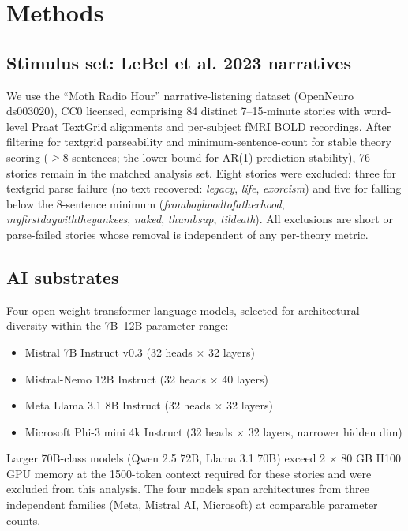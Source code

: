 \documentclass[11pt,a4paper]{article}
\begin{document}
\section{Methods}

\subsection{Stimulus set: LeBel et al. 2023 narratives}

We use the \citet{lebel2023natural} ``Moth Radio Hour'' narrative-listening dataset (OpenNeuro ds003020), CC0 licensed, comprising 84 distinct 7--15-minute stories with word-level Praat TextGrid alignments and per-subject fMRI BOLD recordings. After filtering for textgrid parseability and minimum-sentence-count for stable theory scoring ($\geq 8$ sentences; the lower bound for AR(1) prediction stability), 76 stories remain in the matched analysis set. Eight stories were excluded: three for textgrid parse failure (no text recovered: \emph{legacy}, \emph{life}, \emph{exorcism}) and five for falling below the 8-sentence minimum (\emph{fromboyhoodtofatherhood}, \emph{myfirstdaywiththeyankees}, \emph{naked}, \emph{thumbsup}, \emph{tildeath}). All exclusions are short or parse-failed stories whose removal is independent of any per-theory metric.

\subsection{AI substrates}

Four open-weight transformer language models, selected for architectural diversity within the 7B--12B parameter range:

\begin{itemize}
  \item Mistral 7B Instruct v0.3 (32 heads $\times$ 32 layers)
  \item Mistral-Nemo 12B Instruct (32 heads $\times$ 40 layers)
  \item Meta Llama 3.1 8B Instruct (32 heads $\times$ 32 layers)
  \item Microsoft Phi-3 mini 4k Instruct (32 heads $\times$ 32 layers, narrower hidden dim)
\end{itemize}

Larger 70B-class models (Qwen 2.5 72B, Llama 3.1 70B) exceed 2 $\times$ 80 GB H100 GPU memory at the 1500-token context required for these stories and were excluded from this analysis. The four models span architectures from three independent families (Meta, Mistral AI, Microsoft) at comparable parameter counts.
\end{document}
